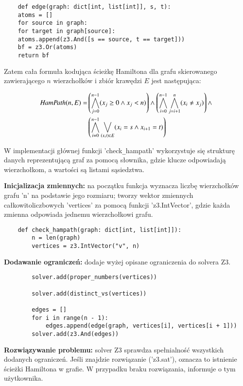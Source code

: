\begin{lstlisting}	
	def edge(graph: dict[int, list[int]], s, t):
	atoms = []
	for source in graph:
	for target in graph[source]:
	atoms.append(z3.And([s == source, t == target]))
	bf = z3.Or(atoms)
	return bf
\end{lstlisting}
\vspace{1cm}

Zatem cała formuła kodująca ścieżkę Hamiltona dla grafu skierowanego zawierającego \(n\) wierzchołków i zbiór krawędzi \(E\) jest następująca:

\begin{align*}
	{\mathit{HamPath}}(n, E) = & \left( \bigwedge_{j=0}^{n-1} (x_j \geq 0 \land x_j < n) \right) \land 
	\left( \bigwedge_{i=0}^{n-1} \bigwedge_{j=i+1}^{n} (x_i \neq x_j) \right) \land \\ 
	& \left( \bigwedge_{i=0}^{n-1} \bigvee_{(s,t) \in E} (x_i = s \land x_{i+1} = t) \right)
\end{align*}

W implementacji głównej funkcji 'check\verb|_|hampath' wykorzystuje się strukturę danych reprezentującą graf za pomocą słownika, gdzie klucze odpowiadają wierzchołkom, a wartości są listami sąsiedztwa.

\textbf{Inicjalizacja zmiennych: } na początku funkcja wyznacza liczbę wierzchołków grafu 'n' na podstawie jego rozmiaru; tworzy wektor zmiennych całkowitoliczbowych 'vertices' za pomocą funkcji 'z3.IntVector', gdzie każda zmienna odpowiada jednemu wierzchołkowi grafu.

\begin{lstlisting}	
	def check_hampath(graph: dict[int, list[int]]):
		n = len(graph)
		vertices = z3.IntVector("v", n)
\end{lstlisting}
	
\textbf{Dodawanie ograniczeń: } dodaje wyżej opisane ograniczenia do solvera Z3.

\begin{lstlisting}
		solver.add(proper_numbers(vertices))
	
		solver.add(distinct_vs(vertices))
	
		edges = []
		for i in range(n - 1):
			edges.append(edge(graph, vertices[i], vertices[i + 1]))
		solver.add(z3.And(edges))
\end{lstlisting}

\textbf{Rozwiązywanie problemu: } solver Z3 sprawdza spełnialność wszystkich dodanych ograniczeń. Jeśli znajdzie rozwiązanie ('z3.sat'), oznacza to istnienie ścieżki Hamiltona w grafie. W przypadku braku rozwiązania, informuje o tym użytkownika.

